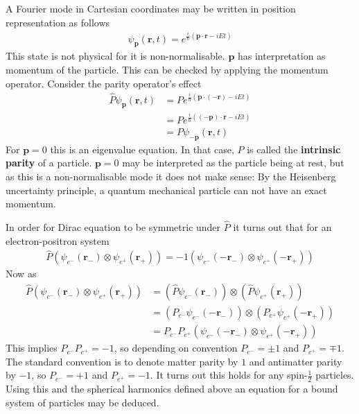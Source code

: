 A Fourier mode in Cartesian coordinates may be written in position representation as follows
\begin{align*}
\psi_\mathbf{p}(\mathbf{r},t) = e^{\frac{i}{\hbar}\left(\mathbf{p}\cdot\mathbf{r}-iE t\right)}
\end{align*}
This state is not physical for it is non-normalisable. $\mathbf{p}$ has interpretation as momentum of the particle. This can be checked by applying the momentum operator. Consider the parity operator's effect
\begin{align*}
\hat{P}\psi_\mathbf{p}(\mathbf{r},t) &= P e^{\frac{i}{\hbar}\left(\mathbf{p}\cdot(-\mathbf{r})-iE t\right)} \\
&= P e^{\frac{i}{\hbar}\left((-\mathbf{p})\cdot\mathbf{r}-iE t\right)} \\
&= P\psi_\mathbf{-p}(\mathbf{r},t)
\end{align*}
For $\mathbf{p}=0$ this is an eigenvalue equation. In that case, $P$ is called the \textbf{intrinsic parity} of a particle. $\mathbf{p}=0$ may be interpreted as the particle being at rest, but as this is a non-normalisable mode it does not make sense: By the Heisenberg uncertainty principle, a quantum mechanical particle can not have an exact momentum. 

In order for Dirac equation to be symmetric under $\hat{P}$ it turns out that for an electron-positron system
\begin{align*}
\hat{P}(\psi_{e^-}(\mathbf{r}_-)\otimes\psi_{e^+}(\mathbf{r}_+))=-1(\psi_{e^-}(-\mathbf{r}_-)\otimes\psi_{e^+}(-\mathbf{r}_+))
\end{align*}
Now as 
\begin{align*}
\hat{P}(\psi_{e^-}(\mathbf{r}_-)\otimes\psi_{e^+}(\mathbf{r}_+)) &= (\hat{P}\psi_{e^-}(\mathbf{r}_-))\otimes (\hat{P}\psi_{e^+}(\mathbf{r}_+)) \\
&= (P_{e^-}\psi_{e^-}(-\mathbf{r}_-))\otimes (P_{e^+}\psi_{e^+}(-\mathbf{r}_+)) \\
&= P_{e^-}P_{e^+}(\psi_{e^-}(-\mathbf{r}_-)\otimes\psi_{e^+}(-\mathbf{r}_+))
\end{align*}
This implies $P_{e^-}P_{e^+}=-1$, so depending on convention $P_{e^-}=\pm 1$ and $P_{e^+}=\mp 1$. The standard convention is to denote matter parity by $1$ and antimatter parity by $-1$, so $P_{e^-}= +1$ and $P_{e^+}=- 1$. It turns out this holds for any spin-$\frac{1}{2}$ particles. Using this and the spherical harmonics defined above an equation for a bound system of particles may be deduced.

